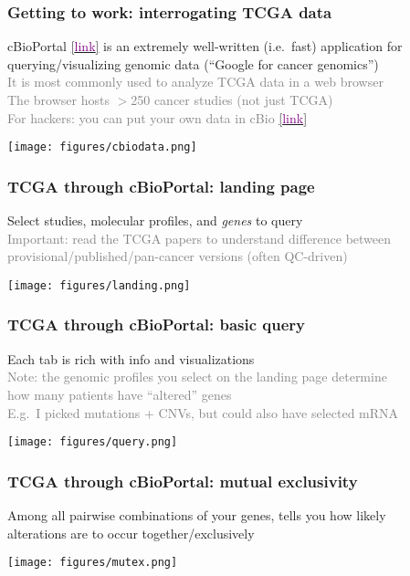 \documentclass{beamer}
\newcommand{\si}[1]{\hspace{.5cm} \textcolor{gray} {#1}\\}
\newcommand{\sicont}[1]{\hspace{1cm} \textcolor{gray} {#1}\\}
\newcommand{\cref}[1]{\href{#1}{[\textcolor{purple}{link}]}}
\begin{document}
{\begin{frame}[t]
\frametitle{Getting to work: interrogating TCGA data}
cBioPortal \cref{http://www.cbioportal.org/} is an extremely well-written (i.e.~fast) application for\\
\hspace{.5cm} querying/visualizing genomic data (``Google for cancer genomics'')\\
\si{It is most commonly used to analyze TCGA data in a web browser}
\si{The browser hosts $>$250 cancer studies (not just TCGA)}
\si{For hackers: you can put your own data in cBio \cref{http://www.cbioportal.org/visualize}}
\begin{center}
\texttt{[image: figures/cbiodata.png]}
\end{center}
\end{frame}

\begin{frame}[t]
\frametitle{TCGA through cBioPortal: landing page}
Select studies, molecular profiles, and \emph{genes} to query\\
\si{Important: read the TCGA papers to understand difference between}
\sicont{provisional/published/pan-cancer versions (often QC-driven)}
\begin{center}
\texttt{[image: figures/landing.png]}
\end{center}
\end{frame}

\begin{frame}[t]
\frametitle{TCGA through cBioPortal: basic query}
Each tab is rich with info and visualizations\\
\si{Note: the genomic profiles you select on the landing page determine}
\sicont{how many patients have ``altered'' genes}
\si{E.g.~I picked mutations + CNVs, but could also have selected mRNA}
\begin{center}
\texttt{[image: figures/query.png]}
\end{center}
\end{frame}

\begin{frame}[t]
\frametitle{TCGA through cBioPortal: mutual exclusivity}
Among all pairwise combinations of your genes, tells you how likely\\
\hspace{.5cm} alterations are to occur together/exclusively\\
\begin{center}
\texttt{[image: figures/mutex.png]}
\end{center}
\end{frame}

}
\end{document}
